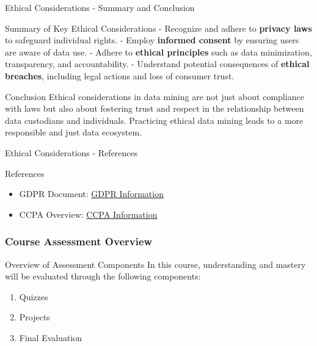 \documentclass[aspectratio=169]{beamer}
\begin{document}
\begin{frame}[fragile]{Ethical Considerations - Summary and Conclusion}
    \begin{block}{Summary of Key Ethical Considerations}
        - Recognize and adhere to \textbf{privacy laws} to safeguard individual rights.
        - Employ \textbf{informed consent} by ensuring users are aware of data use.
        - Adhere to \textbf{ethical principles} such as data minimization, transparency, and accountability.
        - Understand potential consequences of \textbf{ethical breaches}, including legal actions and loss of consumer trust.
    \end{block}

    \begin{block}{Conclusion}
        Ethical considerations in data mining are not just about compliance with laws but also about fostering trust and respect in the relationship between data custodians and individuals. Practicing ethical data mining leads to a more responsible and just data ecosystem.
    \end{block}
\end{frame}

\begin{frame}[fragile]{Ethical Considerations - References}
    \begin{block}{References}
        \begin{itemize}
            \item GDPR Document: \href{https://gdpr-info.eu/}{GDPR Information}
            \item CCPA Overview: \href{https://oag.ca.gov/privacy/ccpa}{CCPA Information}
        \end{itemize}
    \end{block}
\end{frame}

\begin{frame}[fragile]
    \frametitle{Course Assessment Overview}
    \begin{block}{Overview of Assessment Components}
        In this course, understanding and mastery will be evaluated through the following components:
        \begin{enumerate}
            \item Quizzes
            \item Projects
            \item Final Evaluation
        \end{enumerate}
    \end{block}
\end{frame}
\end{document}
